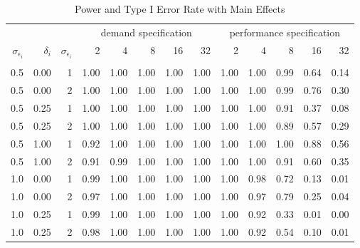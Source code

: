 \begin{table}

\caption{\label{tab:big-basis-table}Power and Type I Error Rate with Main Effects}
\centering
\fontsize{9}{11}\selectfont
\begin{threeparttable}
\begin{tabular}[t]{rrrrrrrrrrrrr}
\toprule
\multicolumn{3}{c}{ } & \multicolumn{5}{c}{demand specification} & \multicolumn{5}{c}{performance specification} \\
\cmidrule(l{3pt}r{3pt}){4-8} \cmidrule(l{3pt}r{3pt}){9-13}
$\sigma_{\epsilon_i}$ & $\delta_i$ & $\sigma_{\epsilon_i}$ & 2 & 4 & 8 & 16 & 32 & 2 & 4 & 8 & 16 & 32\\
\midrule
\addlinespace[0.3em]
\multicolumn{13}{c}{\textbf{Power}}\\
\hspace{1em}0.5 & 0.00 & 1 & 1.00 & 1.00 & 1.00 & 1.00 & 1.00 & 1.00 & 1.00 & 0.99 & 0.64 & 0.14\\
\hspace{1em}0.5 & 0.00 & 2 & 1.00 & 1.00 & 1.00 & 1.00 & 1.00 & 1.00 & 1.00 & 0.99 & 0.76 & 0.30\\
\hspace{1em}0.5 & 0.25 & 1 & 1.00 & 1.00 & 1.00 & 1.00 & 1.00 & 1.00 & 1.00 & 0.91 & 0.37 & 0.08\\
\hspace{1em}0.5 & 0.25 & 2 & 1.00 & 1.00 & 1.00 & 1.00 & 1.00 & 1.00 & 1.00 & 0.89 & 0.57 & 0.29\\
\hspace{1em}0.5 & 1.00 & 1 & 0.92 & 1.00 & 1.00 & 1.00 & 1.00 & 1.00 & 1.00 & 1.00 & 0.88 & 0.56\\
\hspace{1em}0.5 & 1.00 & 2 & 0.91 & 0.99 & 1.00 & 1.00 & 1.00 & 1.00 & 1.00 & 0.91 & 0.60 & 0.35\\
\hspace{1em}1.0 & 0.00 & 1 & 0.99 & 1.00 & 1.00 & 1.00 & 1.00 & 1.00 & 0.98 & 0.72 & 0.13 & 0.01\\
\hspace{1em}1.0 & 0.00 & 2 & 0.97 & 1.00 & 1.00 & 1.00 & 1.00 & 1.00 & 0.97 & 0.79 & 0.25 & 0.04\\
\hspace{1em}1.0 & 0.25 & 1 & 0.99 & 1.00 & 1.00 & 1.00 & 1.00 & 1.00 & 0.92 & 0.33 & 0.01 & 0.00\\
\hspace{1em}1.0 & 0.25 & 2 & 0.98 & 1.00 & 1.00 & 1.00 & 1.00 & 1.00 & 0.92 & 0.54 & 0.10 & 0.01\\

\end{tabular}
\end{threeparttable}
\end{table}
